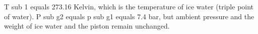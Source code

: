 T sub 1 equals 273.16 Kelvin, which is the temperature of ice water (triple point of water). P sub g2 equals p sub g1 equals 7.4 bar, but ambient pressure and the weight of ice water and the piston remain unchanged.